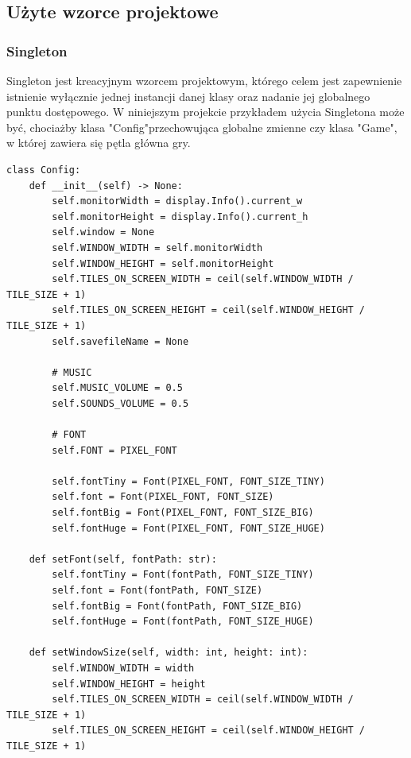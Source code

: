 \documentclass{article}
\begin{document}
\newpage
\subsection{Użyte wzorce projektowe}
\subsubsection{Singleton \cite{wiki:Singleton}}
Singleton jest kreacyjnym wzorcem projektowym, którego celem jest zapewnienie istnienie wyłącznie jednej instancji danej klasy oraz nadanie jej globalnego punktu dostępowego. W niniejszym projekcie przykładem użycia Singletona może być, chociażby klasa "Config"\space przechowująca globalne zmienne czy klasa "Game", w której zawiera się pętla główna gry.
\begin{center}
    \begin{lstlisting}[language=pythonSchema]
class Config:
    def __init__(self) -> None:
        self.monitorWidth = display.Info().current_w
        self.monitorHeight = display.Info().current_h
        self.window = None
        self.WINDOW_WIDTH = self.monitorWidth
        self.WINDOW_HEIGHT = self.monitorHeight
        self.TILES_ON_SCREEN_WIDTH = ceil(self.WINDOW_WIDTH / TILE_SIZE + 1)
        self.TILES_ON_SCREEN_HEIGHT = ceil(self.WINDOW_HEIGHT / TILE_SIZE + 1)
        self.savefileName = None

        # MUSIC
        self.MUSIC_VOLUME = 0.5
        self.SOUNDS_VOLUME = 0.5

        # FONT
        self.FONT = PIXEL_FONT

        self.fontTiny = Font(PIXEL_FONT, FONT_SIZE_TINY)
        self.font = Font(PIXEL_FONT, FONT_SIZE)
        self.fontBig = Font(PIXEL_FONT, FONT_SIZE_BIG)
        self.fontHuge = Font(PIXEL_FONT, FONT_SIZE_HUGE)

    def setFont(self, fontPath: str):
        self.fontTiny = Font(fontPath, FONT_SIZE_TINY)
        self.font = Font(fontPath, FONT_SIZE)
        self.fontBig = Font(fontPath, FONT_SIZE_BIG)
        self.fontHuge = Font(fontPath, FONT_SIZE_HUGE)

    def setWindowSize(self, width: int, height: int):
        self.WINDOW_WIDTH = width
        self.WINDOW_HEIGHT = height
        self.TILES_ON_SCREEN_WIDTH = ceil(self.WINDOW_WIDTH / TILE_SIZE + 1)
        self.TILES_ON_SCREEN_HEIGHT = ceil(self.WINDOW_HEIGHT / TILE_SIZE + 1)
    \end{lstlisting}
\end{center}
\newpage
\end{document}
